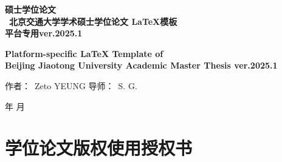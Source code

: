 \renewcommand{\today}{\number\year 年 \number\month 月}
\begin{center}
\vspace*{1.5cm}
\begin{figure}[H] %
  \centering
  
\end{figure}
\vskip 0.1cm
{\song\erhao\ziju{4pt}\textbf{硕士学位论文}}
\vskip 1.2cm
{\,\\\,}
{\song\xiaosan\textbf{ 北京交通大学学术硕士学位论文 \LaTeX{}模板\\ 平台专用ver.2025.1}}
\vskip 1cm

{\song\xiaosan\textbf{ \overleaf{} Platform-specific \LaTeX{} Template of \\Beijing Jiaotong University Academic Master Thesis ver.2025.1}}
\vskip 3.8cm\hspace*{2cm}
\begin{minipage}[t]{5cm}\centering
\hskip -2cm{\sihao\song 作者：\ }{\sihao\song Zeto YEUNG}
\vskip 0.6cm
\hskip -2cm{\sihao\song 导师：\ }{\sihao\song S. G.}
\end{minipage}

\vfill\hspace*{1cm}

\begin{minipage}[t]{5cm}
\begin{center}
{\sihao{}}
\vskip 0.6cm
{\sihao \today}
\end{center}
\end{minipage}

\end{center}



\chapter*{学位论文版权使用授权书}

